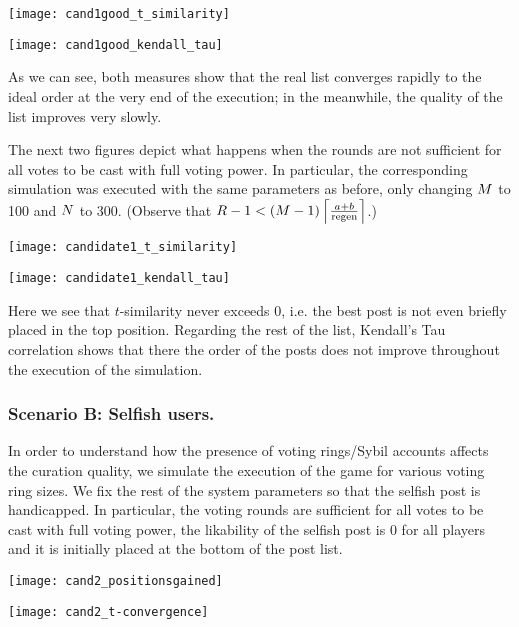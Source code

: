       \texttt{[image: cand1good\_t\_similarity]}

      \texttt{[image: cand1good\_kendall\_tau]}

      As we can see, both measures show that the real list converges rapidly to
      the ideal order at the very end of the execution; in the meanwhile, the
      quality of the list improves very slowly.

      The next two figures depict what happens when the rounds are not
      sufficient for all votes to be cast with full voting power. In particular,
      the corresponding simulation was executed with the same parameters as
      before, only changing $\postlen$ to 100 and $\playerlen$ to 300. (Observe
      that $\rounds - 1 < \left(\postlen - 1\right)\ceil*{\frac{a +
      b}{\regen}}$.)

      \texttt{[image: candidate1\_t\_similarity]}

      \texttt{[image: candidate1\_kendall\_tau]}

      Here we see that $t$-similarity never exceeds 0, i.e. the best post is not
      even briefly placed in the top position. Regarding the rest of the list,
      Kendall's Tau correlation shows that there the order of the posts does not
      improve throughout the execution of the simulation.


    \subsubsection{Scenario B: Selfish users.}
      In order to understand how the presence of voting rings/Sybil accounts
      affects the curation quality, we simulate the execution of the game for
      various voting ring sizes. We fix the rest of the system parameters so
      that the selfish post is handicapped. In particular, the voting rounds are
      sufficient for all votes to be cast with full voting power, the likability
      of the selfish post is 0 for all players and it is initially placed at the
      bottom of the post list.

      \texttt{[image: cand2\_positionsgained]}

      \texttt{[image: cand2\_t-convergence]}
